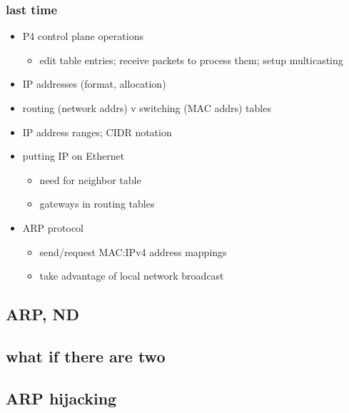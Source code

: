 \date{}
\title{}
\date{}
\usepackage{pgfplots}
\pgfplotsset{compat=1.16}

\begin{frame}
    \titlepage
\end{frame}

\begin{frame}
\frametitle{last time}
\begin{itemize}
\item P4 control plane operations
    \begin{itemize}
    \item edit table entries; receive packets to process them; setup multicasting
    \end{itemize}
\item IP addresses (format, allocation)
\item routing (network addrs) v switching (MAC addrs) tables
\item IP address ranges; CIDR notation
\item putting IP on Ethernet
    \begin{itemize}
    \item need for neighbor table
    \item gateways in routing tables
    \end{itemize}
\item ARP protocol
    \begin{itemize}
    \item send/request MAC:IPv4 address mappings
    \item take advantage of local network broadcast
    \end{itemize}
\end{itemize}
\end{frame}

\subsection{ARP, ND}



\subsection{what if there are two}



\subsection{ARP hijacking}

